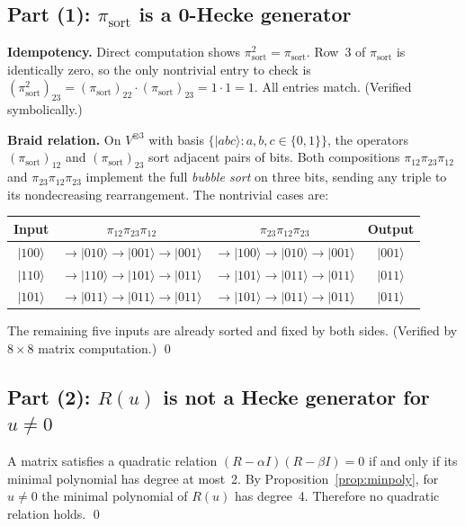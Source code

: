 \documentclass[11pt]{article}
\theoremstyle{remark}
\newcommand{\ket}[1]{|#1\rangle}
\newcommand{\pisort}{\pi_{\mathrm{sort}}}
\begin{document}
\subsection{Part (1): $\pisort$ is a 0-Hecke generator}

\textbf{Idempotency.}
Direct computation shows $\pisort^2 = \pisort$. Row~3 of $\pisort$ is
identically zero, so the only nontrivial entry to check is
$(\pisort^2)_{23} = (\pisort)_{22} \cdot (\pisort)_{23} = 1 \cdot 1 = 1$.
All entries match. (Verified symbolically.)

\textbf{Braid relation.}
On $V^{\otimes 3}$ with basis $\{\ket{abc} : a,b,c \in \{0,1\}\}$,
the operators $(\pisort)_{12}$ and $(\pisort)_{23}$ sort adjacent pairs
of bits. Both compositions $\pi_{12}\pi_{23}\pi_{12}$ and
$\pi_{23}\pi_{12}\pi_{23}$ implement the full \emph{bubble sort} on
three bits, sending any triple to its nondecreasing rearrangement.
The nontrivial cases are:
\begin{center}
\begin{tabular}{@{}cccc@{}}
  \toprule
  Input & $\pi_{12}\pi_{23}\pi_{12}$ & $\pi_{23}\pi_{12}\pi_{23}$ & Output \\
  \midrule
  $\ket{100}$ &
    $\to\ket{010}\to\ket{001}\to\ket{001}$ &
    $\to\ket{100}\to\ket{010}\to\ket{001}$ &
    $\ket{001}$ \\
  $\ket{110}$ &
    $\to\ket{110}\to\ket{101}\to\ket{011}$ &
    $\to\ket{101}\to\ket{011}\to\ket{011}$ &
    $\ket{011}$ \\
  $\ket{101}$ &
    $\to\ket{011}\to\ket{011}\to\ket{011}$ &
    $\to\ket{101}\to\ket{011}\to\ket{011}$ &
    $\ket{011}$ \\
  \bottomrule
\end{tabular}
\end{center}
The remaining five inputs are already sorted and fixed by both sides.
(Verified by $8 \times 8$ matrix computation.) \qed

\subsection{Part (2): $R(u)$ is not a Hecke generator for $u \neq 0$}

A matrix satisfies a quadratic relation $(R - \alpha I)(R - \beta I) = 0$
if and only if its minimal polynomial has degree at most~2. By
Proposition~\ref{prop:minpoly}, for $u \neq 0$ the minimal polynomial of
$R(u)$ has degree~4. Therefore no quadratic relation holds. \qed
\end{document}

